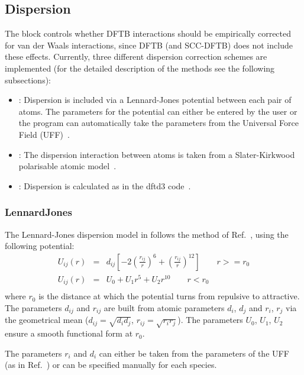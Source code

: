 \subsection{Dispersion}
\label{sec:dftbp.Dispersion}

The  block controls whether DFTB interactions should be
empirically corrected for van der Waals interactions, since DFTB (and
SCC-DFTB) does not include these effects. Currently, three different
dispersion correction schemes are implemented (for the detailed
description of the methods see the following subsections):
\begin{itemize}
\item {}: Dispersion is included via a Lennard-Jones
  potential between each pair of atoms. The parameters for the
  potential can either be entered by the user or the program can
  automatically take the parameters from the Universal Force Field
  (UFF)~\cite{rappe-JACS-114-10024}.
\item {}: The dispersion interaction between atoms is
  taken from a Slater-Kirkwood polarisable atomic
  model~\cite{elstner-jcp-114-5149}.
\item {}: Dispersion is calculated as in the dftd3
  code~\cite{grimme-jcp-132-154104,grimme-jcp-32-1456-1465}.
\end{itemize}

\subsubsection{LennardJones}
\label{sec:dftbp.LennardJones}

The Lennard-Jones dispersion model in \dftbp{} follows the method of
Ref.~\cite{zhechkov-JCTC-1-841}, using the following potential:
\begin{eqnarray*}
U_{ij}(r)&=&d_{ij}\left[-2\left(\frac{r_{ij}}{r}\right)^6 +
  \left(\frac{r_{ij}}{r}\right)^{12}\right]\qquad r >= r_0\\
U_{ij}(r)&=&U_0 + U_1 r^5 + U_2 r^{10}\qquad r < r_0\\
\end{eqnarray*}
where $r_0$ is the distance at which the potential turns from
repulsive to attractive. The parameters $d_{ij}$ and $r_{ij}$ are
built from atomic parameters $d_i$, $d_j$ and $r_i$, $r_j$ via the
geometrical mean ($d_{ij} = \sqrt{d_id_j}$,
$r_{ij}=\sqrt{r_ir_j}$). The parameters $U_0$, $U_1$, $U_2$ ensure a
smooth functional form at $r_0$.

The parameters $r_i$ and $d_i$ can either be taken from the parameters
of the UFF~\cite{rappe-JACS-114-10024} (as in
Ref.~\cite{zhechkov-JCTC-1-841}) or can be specified manually for each
species.

